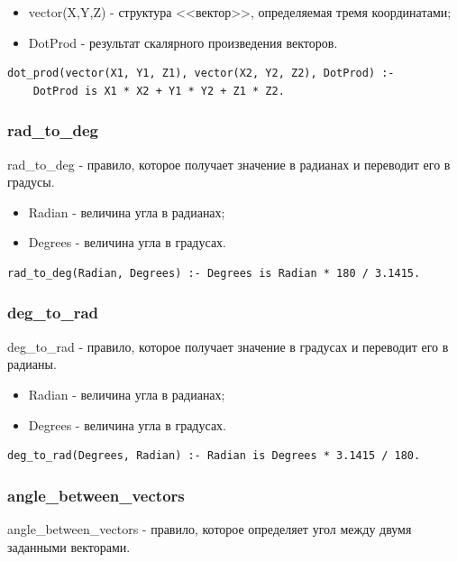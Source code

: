 \begin{itemize}
	\item vector(X,Y,Z) - структура <<вектор>>, определяемая тремя координатами;
	\item DotProd - результат скалярного произведения векторов.
\end{itemize}

\begin{lstlisting}[caption=Реализация правила dot\_prod, label=rules:dotprod]
dot_prod(vector(X1, Y1, Z1), vector(X2, Y2, Z2), DotProd) :-
	DotProd is X1 * X2 + Y1 * Y2 + Z1 * Z2.
\end{lstlisting}

\subsubsection{rad\_to\_deg}
\hspace{0.6cm} rad\_to\_deg - правило, которое получает значение в радианах и переводит его в градусы.

\begin{itemize}
	\item Radian - величина угла в радианах;
	\item Degrees - величина угла в градусах.
\end{itemize}

\begin{lstlisting}[caption=Реализация правила rad\_to\_deg, label=rules:radtodeg]
rad_to_deg(Radian, Degrees) :- Degrees is Radian * 180 / 3.1415.
\end{lstlisting}
\subsubsection{deg\_to\_rad}
\hspace{0.6cm} deg\_to\_rad - правило, которое получает значение в градусах и переводит его в радианы.

\begin{itemize}
	\item Radian - величина угла в радианах;
	\item Degrees - величина угла в градусах.
\end{itemize}

\begin{lstlisting}[caption=Реализация правила deg\_to\_rad, label=rules:degtorad]
deg_to_rad(Degrees, Radian) :- Radian is Degrees * 3.1415 / 180.
\end{lstlisting}

\subsubsection{angle\_between\_vectors}
\hspace{0.6cm} angle\_between\_vectors - правило, которое определяет угол между двумя заданными векторами.

